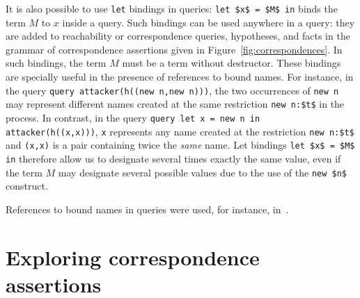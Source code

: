 \documentclass{book}
\begin{document}
It is also possible to use \lstinline!let! bindings in queries:
\lstinline!let $x$ = $M$ in! binds the term $M$ to $x$ inside a query.
Such bindings can be used anywhere in a query: they are added to
reachability or correspondence queries, hypotheses, and facts in the grammar of correspondence
assertions given in Figure~\ref{fig:correspondences}. In such
bindings, the term $M$ must be a term without destructor.  These
bindings are specially useful in the presence of references to bound
names. For instance, in the query
%
\lstinline!query attacker(h((new n,new n)))!,
%
the two occurrences of \lstinline!new n! may represent
different names created at the same restriction \lstinline!new n:$t$!
in the process. In contrast, in the query
%
\lstinline!query let x = new n in attacker(h((x,x)))!,
%
\lstinline!x! represents any name created at
the restriction \lstinline!new n:$t$! and \lstinline!(x,x)! is a pair
containing twice the \emph{same} name. Let bindings
%
\lstinline!let $x$ = $M$ in!
%
therefore allow us to designate several times exactly the
same value, even if the term $M$ may designate several possible values
due to the use of the \lstinline!new $n$! construct.

References to bound names in queries were used, for instance,
in~\cite{Blanchet08b}.


\section{Exploring correspondence assertions}\label{sec:putbegin}
\end{document}
